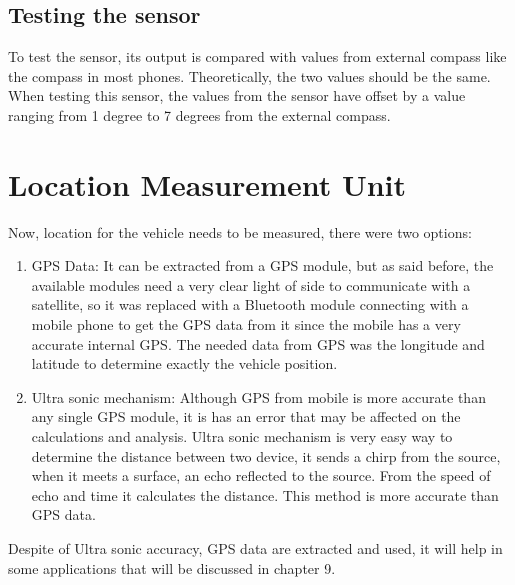 \subsection{Testing the sensor}
To test the sensor, its output is compared with values from external compass like the compass in most phones.
Theoretically, the two values should be the same.
When testing this sensor, the values from the sensor have offset by a value ranging from 1 degree to 7 degrees from the external compass.

\section{Location Measurement Unit}
Now, location for the vehicle needs to be measured, there were two options:
\begin{enumerate}
    \item GPS Data: It can be extracted from a GPS module, but as said before, the available modules need a very clear light of side to communicate with a satellite, so it was replaced with a Bluetooth module connecting with a mobile phone to get the GPS data from it since the mobile has a very accurate internal GPS.
    \newline The needed data from GPS was the longitude and latitude to determine exactly the vehicle position.
    \item Ultra sonic mechanism: Although GPS from mobile is more accurate than any single GPS module, it is has an error that may be affected on the calculations and analysis. Ultra sonic mechanism is very easy way to determine the distance between two device, it sends a chirp from the source, when it meets a surface, an echo reflected to the source. From the speed of echo and time it calculates the distance. This method is more accurate than GPS data.
\end{enumerate}

Despite of Ultra sonic accuracy, GPS data are extracted and used, it will help in some applications that will be discussed in chapter 9.

